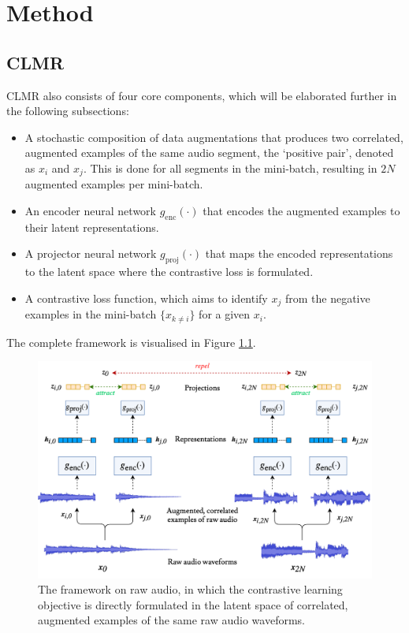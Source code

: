 
\chapter{Method}\label{sec:method}
\section{CLMR}
CLMR also consists of four core components, which will be elaborated further in the following subsections:
\begin{itemize}
    \item A stochastic composition of data augmentations that produces two correlated, augmented examples of the same audio segment, the `positive pair', denoted as $x_i$ and $x_j$. This is done for all segments in the mini-batch, resulting in $2N$ augmented examples per mini-batch.
    \item An encoder neural network $g_{\mathrm{enc}}(\cdot)$ that encodes the augmented examples to their latent representations.
    \item A projector neural network $g_{\mathrm{proj}}(\cdot)$ that maps the encoded representations to the latent space where the contrastive loss is formulated.
    \item A contrastive loss function, which aims to identify $x_j$ from the negative examples in the mini-batch $\{x_{k\neq i}\}$ for a given $x_i$.
\end{itemize}

The complete framework is visualised in Figure \ref{fig:clmr_model}.

\begin{figure}[t]
    \includegraphics[width=\columnwidth]{figs/clmr_model.png}
    \caption{The framework on raw audio, in which the contrastive learning objective is directly formulated in the latent space of correlated, augmented examples of the same raw audio waveforms.}
    \label{fig:clmr_model}
\end{figure}


